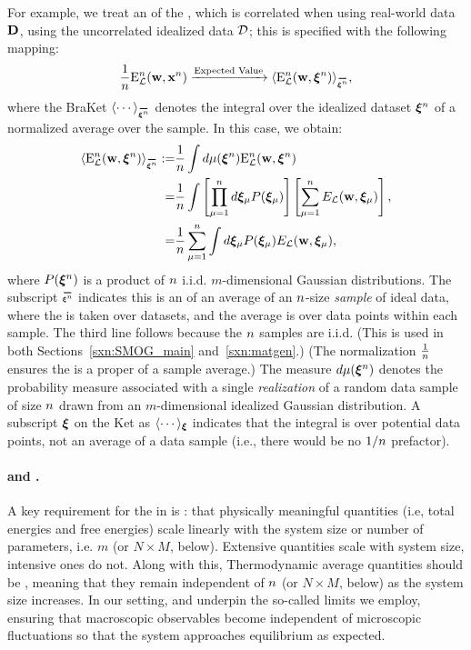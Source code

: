 For example, we treat an \ExpectedValue of the \DataSampleError , which is correlated when using real-world data $\mathbf{D}$, using the uncorrelated idealized data $\mathcal{D}$; this is specified with the following mapping:
\begin{align}
  \label{eqn:Emap}
  \frac{1}{\ND}\DETOPX \xrightarrow{\text{Expected Value}} \langle \DETOPXI \rangle_{\AVGNDXIn}  , %
\end{align}
where the BraKet $\langle\cdots\rangle_{\AVGNDXIn}$ denotes the integral over the idealized dataset $\boldsymbol{\xi}^{n}$ of a normalized average over the sample.
In this case, we obtain:
\begin{align}
  \langle \DETOPXI\rangle_{\AVGNDXIn}
  :=  &\frac{1}{\ND}\int d\mu(\NDXIn) \DETOPXI \nonumber \\
  = &
  \frac{1}{\ND}\int \left[ \prod_{\mu=1}^{\ND}d\XI_{\mu}P(\XI_{\mu})\right] \left[ \sum_{\mu=1}^{\ND}\DETmu \right] , \nonumber \\
  = &
  \frac{1}{\ND}\sum_{\mu=1}^{\ND}\int d\XI_{\mu}P(\XI_{\mu})\DETmu  , 
    \label{eqn:avg_data_sample_error}
\end{align}
where $P(\boldsymbol{\xi}^{n})$ is a product of $n$ i.i.d. $m$-dimensional Gaussian distributions.
The subscript $\AVGNDXIn$ indicates this is an
\ExpectedValue of an average of an $n$-size \emph{sample} of ideal data, where the \ExpectedValue is taken over datasets, and the average is over data points within each sample. The third line follows because the $n$ samples are i.i.d.
(This is used in both Sections~\ref{sxn:SMOG_main} and~\ref{sxn:matgen}.)
(The normalization $\tfrac{1}{n}$ ensures the \BraKet is a proper \ExpectedValue of a sample average.)
The measure $d\mu(\boldsymbol{\xi}^{n})$ 
denotes the probability measure associated with a single 
\emph{realization} of a random data sample of size $n$ drawn from an $m$-dimensional idealized Gaussian distribution.
A subscript $\boldsymbol{\xi}$ on the Ket as $\langle\cdots\rangle_{\boldsymbol{\xi}}$ indicates that the integral is over potential data points, not an average of a data sample (i.e., there would be no $1/n$ prefactor).


\paragraph{\SizeExtensivity and \SizeIntensivity.}
A key requirement for the \ThermodynamicLimit in \STATMECH is \emph{\SizeExtensivity}:
that physically meaningful quantities (i.e, total energies and free energies)
scale linearly with the system size or number of parameters, i.e. $m$ (or $N\times M$, below).
Extensive quantities scale with system size, intensive ones do not.
Along with this, Thermodynamic average quantities should be \emph{\SizeIntensive},
meaning that they remain independent of $n$ (or $N\times M$, below) as the system size increases.
In our setting, \SizeExtensivity and \SizeIntensivity underpin the so-called \LargeN limits we employ,
ensuring that macroscopic observables become independent of
microscopic fluctuations so that the system approaches equilibrium as expected.

